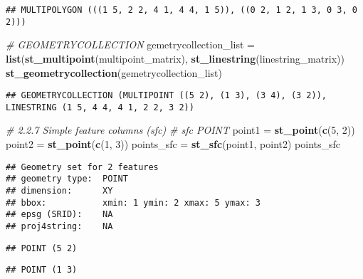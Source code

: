 \documentclass[]{article}
\newenvironment{Shaded}{\begin{snugshade}}{\end{snugshade}}
\newcommand{\CommentTok}[1]{\textcolor[rgb]{0.56,0.35,0.01}{\textit{#1}}}
\newcommand{\DecValTok}[1]{\textcolor[rgb]{0.00,0.00,0.81}{#1}}
\newcommand{\KeywordTok}[1]{\textcolor[rgb]{0.13,0.29,0.53}{\textbf{#1}}}
\newcommand{\NormalTok}[1]{#1}
\newcommand{\StringTok}[1]{\textcolor[rgb]{0.31,0.60,0.02}{#1}}
\begin{document}
\begin{verbatim}
## MULTIPOLYGON (((1 5, 2 2, 4 1, 4 4, 1 5)), ((0 2, 1 2, 1 3, 0 3, 0 2)))
\end{verbatim}

\begin{Shaded}
\begin{Highlighting}[]
\CommentTok{# GEOMETRYCOLLECTION}
\NormalTok{gemetrycollection_list =}\StringTok{ }\KeywordTok{list}\NormalTok{(}\KeywordTok{st_multipoint}\NormalTok{(multipoint_matrix),}
                              \KeywordTok{st_linestring}\NormalTok{(linestring_matrix))}
\KeywordTok{st_geometrycollection}\NormalTok{(gemetrycollection_list)}
\end{Highlighting}
\end{Shaded}

\begin{verbatim}
## GEOMETRYCOLLECTION (MULTIPOINT ((5 2), (1 3), (3 4), (3 2)), LINESTRING (1 5, 4 4, 4 1, 2 2, 3 2))
\end{verbatim}

\begin{Shaded}
\begin{Highlighting}[]
\CommentTok{# 2.2.7 Simple feature columns (sfc)}
\CommentTok{# sfc POINT}
\NormalTok{point1 =}\StringTok{ }\KeywordTok{st_point}\NormalTok{(}\KeywordTok{c}\NormalTok{(}\DecValTok{5}\NormalTok{, }\DecValTok{2}\NormalTok{))}
\NormalTok{point2 =}\StringTok{ }\KeywordTok{st_point}\NormalTok{(}\KeywordTok{c}\NormalTok{(}\DecValTok{1}\NormalTok{, }\DecValTok{3}\NormalTok{))}
\NormalTok{points_sfc =}\StringTok{ }\KeywordTok{st_sfc}\NormalTok{(point1, point2)}
\NormalTok{points_sfc}
\end{Highlighting}
\end{Shaded}

\begin{verbatim}
## Geometry set for 2 features 
## geometry type:  POINT
## dimension:      XY
## bbox:           xmin: 1 ymin: 2 xmax: 5 ymax: 3
## epsg (SRID):    NA
## proj4string:    NA
\end{verbatim}

\begin{verbatim}
## POINT (5 2)
\end{verbatim}

\begin{verbatim}
## POINT (1 3)
\end{verbatim}
\end{document}
